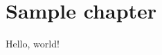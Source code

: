 \documentclass[declaration,shortabstract,english,inz]{iithesis}
\author{Damian Górski}
\date{30 czerwca 2017 r.} %
\begin{document}
\chapter{Sample chapter}
Hello, world!


\end{document}
